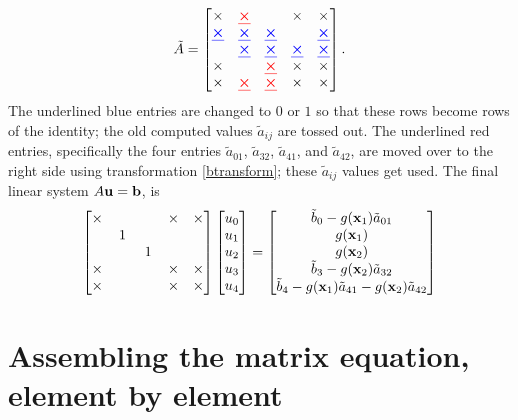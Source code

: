 \begin{example}
\begin{equation*}
\tilde A = \begin{bmatrix}
\times & {\color{red} \bm{\underline{\times}}} &    & \times & \times \\
{\color{blue} \bm{\underline{\times}}} & {\color{blue} \bm{\underline{\times}}} & {\color{blue} \bm{\underline{\times}}} &    & {\color{blue} \bm{\underline{\times}}} \\
   & {\color{blue} \bm{\underline{\times}}} & {\color{blue} \bm{\underline{\times}}} & {\color{blue} \bm{\underline{\times}}} & {\color{blue} \bm{\underline{\times}}} \\
\times &    & {\color{red} \bm{\underline{\times}}} & \times & \times \\
\times & {\color{red} \bm{\underline{\times}}} & {\color{red} \bm{\underline{\times}}} & \times & \times
\end{bmatrix}.
\end{equation*}
The underlined {\color{blue} blue} entries are changed to $0$ or $1$ so that these rows become rows of the identity; the old computed values $\tilde a_{ij}$ are tossed out.  The underlined {\color{red} red} entries, specifically the four entries $\tilde a_{01}$, $\tilde a_{32}$, $\tilde a_{41}$, and $\tilde a_{42}$, are moved over to the right side using transformation \eqref{btransform}; these $\tilde a_{ij}$ values get used.  The final linear system $A \mathbf{u} = \mathbf{b}$, is
\begin{equation*}
\begin{bmatrix}
\times & & & \times & \times \\
 & \,1\, & & & \\
 & & \,1\, & & \\
\times & & & \times & \times \\
\times & & & \times & \times
\end{bmatrix}
\begin{bmatrix}
u_0 \\
u_1 \\
u_2 \\
u_3 \\
u_4
\end{bmatrix}
=
\begin{bmatrix}
\tilde b_0 - g(\mathbf{x}_1) \tilde a_{01} \\
g(\mathbf{x}_1) \\
g(\mathbf{x}_2) \\
\tilde b_3 - g(\mathbf{x}_2) \tilde a_{32} \\
\tilde b_4 - g(\mathbf{x}_1) \tilde a_{41} - g(\mathbf{x}_2) \tilde a_{42}
\end{bmatrix}
\end{equation*}
\end{example}
\noindent\hrulefill

\bigskip


\section{Assembling the matrix equation, element by element}

